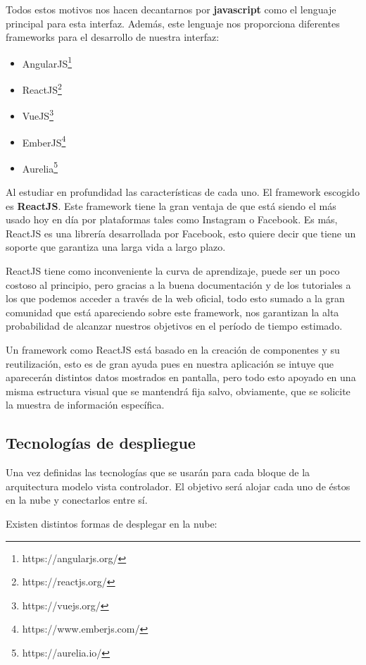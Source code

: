 Todos estos motivos nos hacen decantarnos por \textbf{javascript} como el lenguaje principal para esta interfaz. Además, este lenguaje nos proporciona diferentes frameworks para el desarrollo de nuestra interfaz\cite{framework}:

\begin{itemize}
    \item AngularJS\footnote{https://angularjs.org/}
    \item ReactJS\footnote{https://reactjs.org/}
    \item VueJS\footnote{https://vuejs.org/}
    \item EmberJS\footnote{https://www.emberjs.com/}
    \item Aurelia\footnote{https://aurelia.io/}
\end{itemize}

Al estudiar en profundidad las características de cada uno\cite{framework2}. El framework escogido es \textbf{ReactJS}. Este framework tiene la gran ventaja de que está siendo el más usado hoy en día por plataformas tales como Instagram o Facebook. Es más, ReactJS es una librería desarrollada por Facebook, esto quiere decir que tiene un soporte que garantiza una larga vida a largo plazo.

ReactJS tiene como inconveniente la curva de aprendizaje, puede ser un poco costoso al principio, pero gracias a la buena documentación y de los tutoriales a los que podemos acceder a través de la web oficial, todo esto sumado a la gran comunidad que está apareciendo sobre este framework, nos garantizan la alta probabilidad de alcanzar nuestros objetivos en el período de tiempo estimado.

Un framework como ReactJS está basado en la creación de componentes y su reutilización, esto es de gran ayuda pues en nuestra aplicación se intuye que aparecerán distintos datos mostrados en pantalla, pero todo esto apoyado en una misma estructura visual que se mantendrá fija salvo, obviamente, que se solicite la muestra de información específica.

\subsection{Tecnologías de despliegue}

Una vez definidas las tecnologías que se usarán para cada bloque de la arquitectura modelo vista controlador. El objetivo será alojar cada uno de éstos en la nube y conectarlos entre sí. 

Existen distintos formas de desplegar en la nube\cite{cloud}\cite{cloud2}\cite{cloud3}\cite{cloud4}:

